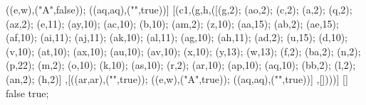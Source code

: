 ((e,w),("\state A",false)); ((aq,aq),("",true))] [(c1,(g,h,([(g,2); (ao,2); (c,2); (a,2); (q,2); (az,2); (e,11); (ay,10); (ac,10); (b,10); (am,2); (z,10); (aa,15); (ab,2); (ae,15); (af,10); (ai,11); (aj,11); (ak,10); (al,11); (ag,10); (ah,11); (ad,2); (u,15); (d,10); (v,10); (at,10); (ax,10); (au,10); (av,10); (x,10); (y,13); (w,13); (f,2); (ba,2); (n,2); (p,22); (m,2); (o,10); (k,10); (as,10); (r,2); (ar,10); (ap,10); (aq,10); (bb,2); (l,2); (an,2); (h,2)] ,[((ar,ar),("",true)); ((e,w),("\state A",true)); ((aq,aq),("",true))] ,[])))] [] false true;
